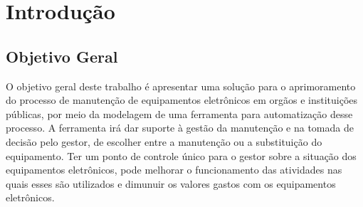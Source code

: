 \chapter{Introdução}


\section{Objetivo Geral}

O objetivo geral deste trabalho é apresentar uma solução para o aprimoramento do processo de manutenção de equipamentos eletrônicos em orgãos e instituições públicas, por meio da modelagem de uma ferramenta para automatização desse processo. A ferramenta irá dar suporte à gestão da manutenção e na tomada de decisão pelo gestor, de escolher entre a manutenção ou a substituição do equipamento. Ter um ponto de controle único para o gestor sobre a situação dos equipamentos eletrônicos, pode melhorar o funcionamento das atividades nas quais esses são utilizados  e dimunuir os valores gastos com os equipamentos eletrônicos.

%



